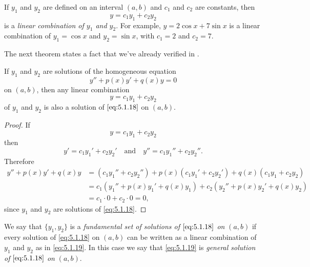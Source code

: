 
If $y_1$ and $y_2$ are defined on an interval
$(a,b)$ and $c_1$ and $c_2$ are constants, then
\[
y=c_1y_1+c_2y_2
\]
is a \emph{\color{blue}linear combination of $y_1$ and $y_2$}. For
example, $y=2\cos x+7 \sin x$ is a linear combination of $y_1=
\cos x$ and $y_2=\sin x$, with $c_1=2$ and $c_2=7$.


The next theorem states a fact that we've already verified in
.

\begin{theorem}\label{thmtype:5.1.2}
If $y_1$ and $y_2$ are solutions of the homogeneous equation
\begin{equation}\label{eq:5.1.18}
y''+p(x)y'+q(x)y=0
\end{equation}
on $(a,b)$, then any linear combination
\begin{equation}\label{eq:5.1.19}
y=c_1y_1+c_2y_2
\end{equation}
of $y_1$ and $y_2$ is also a solution of $\eqref{eq:5.1.18}$ on $(a,b)$.
\end{theorem}

\begin{proof}
 If
\[
y=c_1y_1+c_2y_2
\]
 then
\[
y'=c_1y_1'+c_2y_2'\quad\text{and}\quad y''=c_1y_1''+c_2y_2''.
\]
Therefore
\begin{align*}
y''+p(x)y'+q(x)y&=(c_1y_1''+c_2y_2'')+p(x)(c_1y_1'+c_2y_2')
+q(x)(c_1y_1+c_2y_2)\\
&=c_1\left(y_1''+p(x)y_1'+q(x)y_1\right)
+c_2\left(y_2''+p(x)y_2'+q(x)y_2\right)\\
&=c_1\cdot0+c_2\cdot0=0,
\end{align*}
since $y_1$ and $y_2$ are solutions of \eqref{eq:5.1.18}.
\end{proof}

We say that  $\{y_1,y_2\}$ is a \emph{\color{blue}fundamental set of
solutions of $\eqref{eq:5.1.18}$ on} $(a,b)$ if every solution
of \eqref{eq:5.1.18} on  $(a,b)$  can be written as a linear
combination of $y_1$ and $y_2$ as in \eqref{eq:5.1.19}.
In this case we say that \eqref{eq:5.1.19} is
\emph{\color{blue}general solution of $\eqref{eq:5.1.18}$ on} $(a,b)$.


